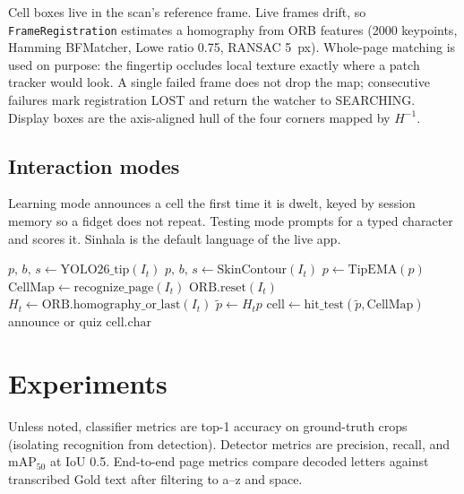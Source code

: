 \documentclass[conference]{IEEEtran}
\begin{document}
Cell boxes live in the scan's reference frame. Live frames drift, so
\texttt{FrameRegistration} estimates a homography from ORB features
(2000 keypoints, Hamming BFMatcher, Lowe ratio 0.75, RANSAC 5~px).
Whole-page matching is used on purpose: the fingertip occludes local
texture exactly where a patch tracker would look. A single failed frame
does not drop the map; consecutive failures mark registration LOST and
return the watcher to SEARCHING. Display boxes are the axis-aligned
hull of the four corners mapped by $H^{-1}$.

\subsection{Interaction modes}
Learning mode announces a cell the first time it is dwelt, keyed by
session memory so a fidget does not repeat. Testing mode prompts for a
typed character and scores it. Sinhala is the default language of the
live app.

\begin{algorithm}[t]
\caption{Per-frame live loop (simplified)}
\label{alg:live}
\begin{algorithmic}[1]
\State $p,\,b,\,s \gets \mathrm{YOLO26\_tip}(I_t)$
  \State $p,\,b,\,s \gets \mathrm{SkinContour}(I_t)$ 
\EndIf
\State $p \gets \mathrm{TipEMA}(p)$
  \State $\mathrm{CellMap} \gets \mathrm{recognize\_page}(I_t)$
  \State $\mathrm{ORB.reset}(I_t)$
\EndIf
\State $H_t \gets \mathrm{ORB.homography\_or\_last}(I_t)$
\State $\tilde{p} \gets H_t p$ 
\State $\mathrm{cell} \gets \mathrm{hit\_test}(\tilde{p},\mathrm{CellMap})$
  \State announce or quiz $\mathrm{cell}.\mathrm{char}$
\EndIf
\end{algorithmic}
\end{algorithm}

\section{Experiments}
\label{sec:exp}

Unless noted, classifier metrics are top-1 accuracy on ground-truth
crops (isolating recognition from detection). Detector metrics are
precision, recall, and mAP$_{50}$ at IoU 0.5. End-to-end page metrics
compare decoded letters against transcribed Gold text after filtering
to a--z and space.
\end{document}
